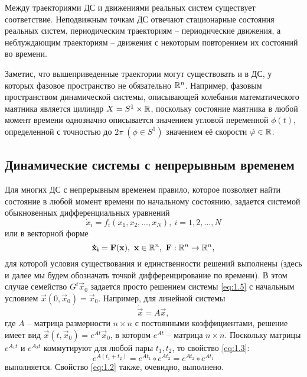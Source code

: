Между траекториями ДС и движениями реальных систем существует соответствие. Неподвижным точкам ДС отвечают стационарные состояния реальных систем, периодическим траекториям -- периодические движения, а неблуждающим траекториям -- движения с некоторым повторением их состояний во времени.

Заметис, что вышеприведенные траектории могут существовать и в ДС, у которых фазовое пространство не обязательно $\mathbb{R}^n$. Например, фазовым пространством динамической системы, описывающей колебания математического маятника является цилиндр $X= S^1 \times \mathbb{R} $, поскольку состояние маятника в любой момент времени однозначно описывается значением угловой переменной $\phi(t)$, определенной с точностью до $2\pi ~ (\phi \in S^1)$  значением её скорости $\dot {\varphi} \in \mathbb{R}$.

\subsection{Динамические системы с непрерывным временем} %
Для многих ДС с непрерывным временем правило, которое позволяет найти состояние в любой момент времени по начальному состоянию, задается системой обыкновенных дифференциальных уравнений
\begin{equation}
	\dot x_i = f_i (x_1,x_2,\dots, x_N), ~ i = 1,2, \dots, N
\end{equation}
или в векторной форме
\begin{equation}
	\label{eq:1.5}
	\mathbf {\dot x_i} = \mathbf F (\mathbf x), ~ \mathbf x \in \mathbb{R}^n, ~ \mathbf F: \mathbb{R}^n \rightarrow \mathbb{R}^n,
\end{equation}
для которой условия существования и единственности решений выполнены (здесь и далее мы будем обозначать точкой дифференцирование по времени). В этом случае семейство $G^t \vec x_0$ задается просто решением системы \eqref{eq:1.5} с начальным условием $\vec x(0, \vec x_0)= \vec x_0$. Например, для линейной системы
\begin{equation}
	\dot {\vec x} = A \vec x,
\end{equation} 
где $A$ -- матрица размерности $n \times n $ с постоянными коэффициентами, решение имеет вид $\vec x(t, \vec x_0)= e^{At} \vec x_0$, в котором $e^{At}$ -- матрица $n \times n$. Поскольку матрицы $e^{A_1t}$ и $e^{A_2t}$ коммутируют для любой пары $t_1, t_2$, то свойство \eqref{eq:1.3}:
\begin{equation}
	e^{A(t_1+t_2)}= e^{At_1}\circ e^{At_2} = e^{At_2}\circ e^{At_1} 
\end{equation}
выполняется. Свойство \eqref{eq:1.2} также, очевидно, выполнено.

